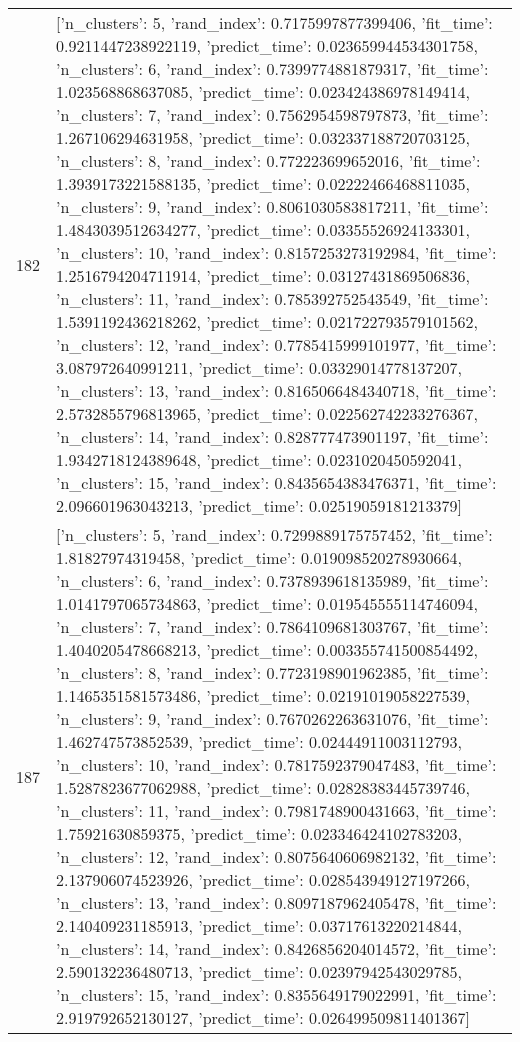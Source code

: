 \begin{tabular}{rl}
182 & [{'n_clusters': 5, 'rand_index': 0.7175997877399406, 'fit_time': 0.9211447238922119, 'predict_time': 0.023659944534301758}, {'n_clusters': 6, 'rand_index': 0.7399774881879317, 'fit_time': 1.023568868637085, 'predict_time': 0.023424386978149414}, {'n_clusters': 7, 'rand_index': 0.7562954598797873, 'fit_time': 1.267106294631958, 'predict_time': 0.032337188720703125}, {'n_clusters': 8, 'rand_index': 0.772223699652016, 'fit_time': 1.3939173221588135, 'predict_time': 0.02222466468811035}, {'n_clusters': 9, 'rand_index': 0.8061030583817211, 'fit_time': 1.4843039512634277, 'predict_time': 0.03355526924133301}, {'n_clusters': 10, 'rand_index': 0.8157253273192984, 'fit_time': 1.2516794204711914, 'predict_time': 0.03127431869506836}, {'n_clusters': 11, 'rand_index': 0.785392752543549, 'fit_time': 1.5391192436218262, 'predict_time': 0.021722793579101562}, {'n_clusters': 12, 'rand_index': 0.7785415999101977, 'fit_time': 3.087972640991211, 'predict_time': 0.03329014778137207}, {'n_clusters': 13, 'rand_index': 0.8165066484340718, 'fit_time': 2.5732855796813965, 'predict_time': 0.022562742233276367}, {'n_clusters': 14, 'rand_index': 0.828777473901197, 'fit_time': 1.9342718124389648, 'predict_time': 0.0231020450592041}, {'n_clusters': 15, 'rand_index': 0.8435654383476371, 'fit_time': 2.096601963043213, 'predict_time': 0.02519059181213379}] \\
187 & [{'n_clusters': 5, 'rand_index': 0.7299889175757452, 'fit_time': 1.81827974319458, 'predict_time': 0.019098520278930664}, {'n_clusters': 6, 'rand_index': 0.7378939618135989, 'fit_time': 1.0141797065734863, 'predict_time': 0.019545555114746094}, {'n_clusters': 7, 'rand_index': 0.7864109681303767, 'fit_time': 1.4040205478668213, 'predict_time': 0.003355741500854492}, {'n_clusters': 8, 'rand_index': 0.7723198901962385, 'fit_time': 1.1465351581573486, 'predict_time': 0.02191019058227539}, {'n_clusters': 9, 'rand_index': 0.7670262263631076, 'fit_time': 1.462747573852539, 'predict_time': 0.02444911003112793}, {'n_clusters': 10, 'rand_index': 0.7817592379047483, 'fit_time': 1.5287823677062988, 'predict_time': 0.02828383445739746}, {'n_clusters': 11, 'rand_index': 0.7981748900431663, 'fit_time': 1.75921630859375, 'predict_time': 0.023346424102783203}, {'n_clusters': 12, 'rand_index': 0.8075640606982132, 'fit_time': 2.137906074523926, 'predict_time': 0.028543949127197266}, {'n_clusters': 13, 'rand_index': 0.8097187962405478, 'fit_time': 2.140409231185913, 'predict_time': 0.03717613220214844}, {'n_clusters': 14, 'rand_index': 0.8426856204014572, 'fit_time': 2.590132236480713, 'predict_time': 0.02397942543029785}, {'n_clusters': 15, 'rand_index': 0.8355649179022991, 'fit_time': 2.919792652130127, 'predict_time': 0.026499509811401367}] \\

\end{tabular}
